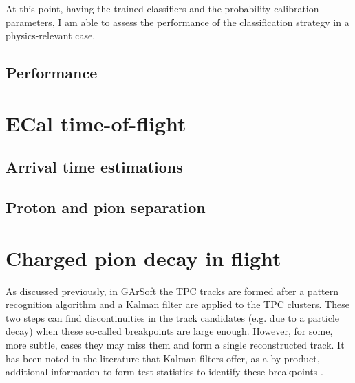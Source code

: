 At this point, having the trained classifiers and the probability calibration parameters, I am able to assess the performance of the classification strategy in a physics-relevant case.

\subsection{Performance}

\section{ECal time-of-flight}

\subsection{Arrival time estimations}

\subsection{Proton and pion separation}

\section{Charged pion decay in flight}

As discussed previously, in GArSoft the TPC tracks are formed after a pattern recognition algorithm and a Kalman filter are applied to the TPC clusters. These two steps can find discontinuities in the track candidates (e.g. due to a particle decay) when these so-called breakpoints are large enough. However, for some, more subtle, cases they may miss them and form a single reconstructed track. It has been noted in the literature that Kalman filters offer, as a by-product, additional information to form test statistics to identify these breakpoints \cite{Fruehwirth1988,Astier2000}.

